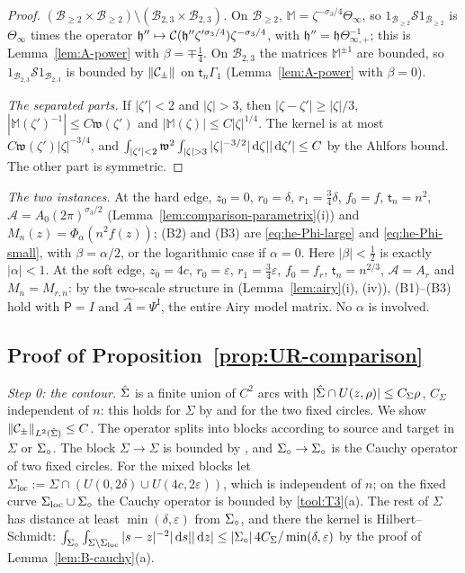 \begin{proof}
\emph{$(\mathcal B_{\ge2}\times\mathcal B_{\ge2})\setminus(\mathcal B_{2,3}\times\mathcal B_{2,3})$.} On $\mathcal B_{\ge2}$, $\mathbb M=\zeta^{-\sigma_3/4}\Theta_\infty$, so $1_{\mathcal B_{\ge2}}\mathcal S1_{\mathcal B_{\ge2}}$ is
$\Theta_\infty$ times the operator $\mathfrak h''\mapsto\mathcal{C}(\mathfrak h''\zeta'^{\sigma_3/4})\zeta^{-\sigma_3/4}$, with
$\mathfrak h''=\mathfrak h\Theta_{\infty,+}^{-1}$; this is Lemma~\ref{lem:A-power} with $\beta=\mp\frac14$. On $\mathcal B_{2,3}$ the matrices
$\mathbb M^{\pm1}$ are bounded, so $1_{\mathcal B_{2,3}}\mathcal S1_{\mathcal B_{2,3}}$ is bounded by $\|\mathcal{C}_\pm\|$ on $\mathsf t_n\Gamma_1$
(Lemma~\ref{lem:A-power} with $\beta=0$).

\emph{The separated parts.} If $|\zeta'|<2$ and $|\zeta|>3$, then $|\zeta-\zeta'|\ge|\zeta|/3$, $|\mathbb M(\zeta')^{-1}|\le
C\mathfrak w(\zeta')$ and $|\mathbb M(\zeta)|\le C|\zeta|^{1/4}$. The kernel is at most $C\mathfrak w(\zeta')|\zeta|^{-3/4}$, and
$\int_{|\zeta'|<2}\mathfrak w^2\int_{|\zeta|>3}|\zeta|^{-3/2}|\diff\zeta||\diff\zeta'|\le C$ by the Ahlfors bound. The other part is
symmetric.
\end{proof}

\emph{The two instances.} At the hard edge, $z_0=0$, $r_0=\delta$, $r_1=\frac34\delta$, $f_0=f$, $\mathsf t_n=n^2$,
$\mathcal A=A_0(2\pi)^{\sigma_3/2}$ (Lemma~\ref{lem:comparison-parametrix}(i)) and $M_n(z)=\Phi_\alpha(n^2f(z))$; (B2) and (B3) are
\eqref{eq:he-Phi-large} and \eqref{eq:he-Phi-small}, with $\beta=\alpha/2$, or the logarithmic case if $\alpha=0$. Here
$|\beta|<\frac12$ is exactly $|\alpha|<1$. At the soft edge, $z_0=4c$, $r_0=\varepsilon$, $r_1=\frac34\varepsilon$,
$f_0=f_r$, $\mathsf t_n=n^{2/3}$, $\mathcal A=A_r$ and $M_n=M_{r,n}$: by the two-scale structure in 
(Lemma~\ref{lem:airy}(i), (iv)), (B1)--(B3) hold with $\mathsf P=I$ and $\hat A=\Psi^{\mathrm I}$, the entire Airy model matrix.
No $\alpha$ is involved.

\subsection{Proof of Proposition~\ref{prop:UR-comparison}}\label{sec:B-proof}

\emph{Step 0: the contour.} $\hat\Sigma$ is a finite union of $C^2$ arcs with $|\hat\Sigma\cap U(z,\rho)|\le C_\Sigma\rho$, $C_\Sigma$ independent
of $n$: this holds for $\Sigma$ by  and for the two fixed circles. We show $\|\mathcal{C}_\pm\|_{L^2(\hat\Sigma)}\le C$. The
operator splits into blocks according to source and target in $\Sigma$ or $\Sigma_{\circ}$. The block $\Sigma\to\Sigma$ is
bounded by , and $\Sigma_{\circ}\to\Sigma_{\circ}$ is the Cauchy operator of two fixed circles. For the mixed blocks let
$\Sigma_{\mathrm{loc}}:=\Sigma\cap(U(0,2\delta)\cup U(4c,2\varepsilon))$, which is independent of $n$; on the fixed curve
$\Sigma_{\mathrm{loc}}\cup\Sigma_{\circ}$ the Cauchy operator is bounded by \ref{tool:T3}(a). The rest of $\Sigma$ has distance at
least $\min(\delta,\varepsilon)$ from $\Sigma_{\circ}$, and there the kernel is Hilbert--Schmidt:
$\int_{\Sigma_{\circ}}\int_{\Sigma\setminus\Sigma_{\mathrm{loc}}}|s-z|^{-2}|\,\mathrm{d} s||\,\mathrm{d} z|\le|\Sigma_{\circ}|\,4C_\Sigma/\min(\delta,\varepsilon)$ by the proof
of Lemma~\ref{lem:B-cauchy}(a).


